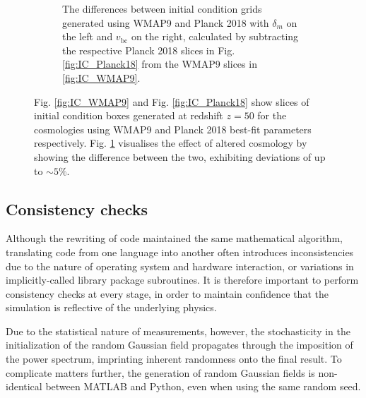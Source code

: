 \documentclass[floats,floatfix,showpacs,amssymb,prd,superscriptaddress,nofootinbib]{revtex4-2} %
\newcommand{\red}{\textcolor{red}}
\begin{document}
\begin{figure}
\begin{subfigure}[b]{0.9\textwidth}
         \caption{The differences between initial condition grids generated using WMAP9 and Planck 2018 with $\delta_m$ on the left and $v_{\text{bc}}$ on the right, calculated by subtracting the respective Planck 2018 slices in Fig. \ref{fig:IC_Planck18} from the WMAP9 slices in \ref{fig:IC_WMAP9}.}
         \label{fig:IC_difference_WMAP9_Planck18}
     \end{subfigure}
        \caption{Fig. \ref{fig:IC_WMAP9} and Fig. \ref{fig:IC_Planck18} show slices of initial condition boxes generated at redshift $z = 50$ for the cosmologies using WMAP9 and Planck 2018 best-fit parameters respectively. Fig. \ref{fig:IC_difference_WMAP9_Planck18} visualises the effect of altered cosmology by showing the difference between the two, exhibiting deviations of up to $\sim 5 \%$.}
        \label{fig:IC_WMAP9_Planck18}
\end{figure}

\subsection{Consistency checks}
Although the rewriting of code maintained the same mathematical algorithm, translating code from one language into another often introduces inconsistencies due to the nature of operating system and hardware interaction, or variations in implicitly-called library package subroutines. It is therefore important to perform consistency checks at every stage, in order to maintain confidence that the simulation is reflective of the underlying physics.

Due to the statistical nature of measurements, however, the stochasticity in the initialization of the random Gaussian field propagates through the imposition of the power spectrum, imprinting inherent randomness onto the final result. To complicate matters further, the generation of random Gaussian fields is non-identical between MATLAB and Python, even when using the same random seed. 
\end{document}
